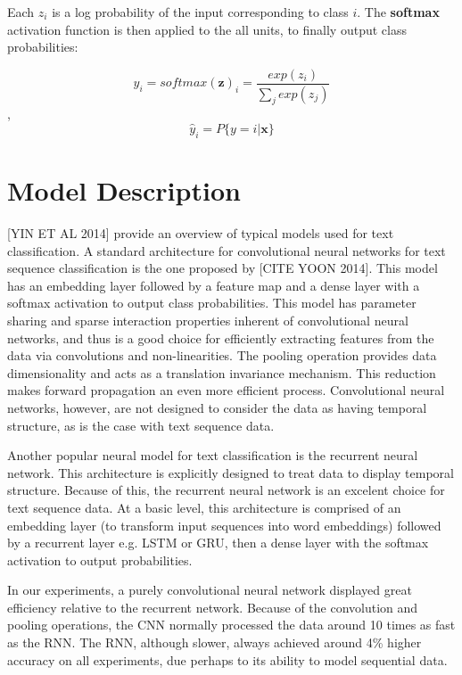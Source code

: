 Each  $z_i$ is a log probability of the input corresponding to class $i$. The \textbf{softmax} activation function is then applied to
the all units, to finally output class probabilities:

\[\hat{y}_i = softmax(\bm{z})_i = \frac{exp(z_i)}{\sum_j exp(z_j)}\],
\[\hat{y}_i = P\{y=i|\bm{x}\}\]

\section{Model Description}

[YIN ET AL 2014] provide an overview of typical models used for text classification.
A standard architecture for convolutional neural networks for text sequence classification is the one proposed by
[CITE YOON 2014]. This model has an embedding layer followed by a feature map and a dense layer with a softmax activation
to output class probabilities. This model has parameter sharing and sparse interaction properties inherent of convolutional
neural networks, and thus is a good choice for efficiently extracting features from the data via convolutions and non-linearities.
The pooling operation provides data dimensionality and acts as a translation invariance mechanism. This reduction makes forward propagation
an even more efficient process. Convolutional neural networks, however, are not designed to consider the data as having temporal
structure, as is the case with text sequence data.

Another popular neural model for text classification is the recurrent neural network. This architecture is explicitly designed to treat
data to display temporal structure. Because of this, the recurrent neural network is an excelent choice for text sequence data.
At a basic level, this architecture is comprised of an embedding layer (to transform input sequences into word embeddings)
followed by a recurrent layer e.g. LSTM or GRU, then a dense layer with the softmax activation to output probabilities.

In our experiments, a purely convolutional neural network displayed great efficiency relative to the recurrent network. Because of the convolution
and pooling operations, the CNN normally processed the data around 10 times as fast as the RNN. The RNN, although slower,
always achieved around 4\% higher accuracy on all experiments, due perhaps to its ability to model sequential data.

